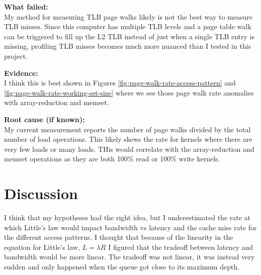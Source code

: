 \documentclass[11pt]{article}
\begin{document}
\begin{failurebox}
	\textbf{What failed:} \\
	My method for measuring TLB page walks likely is not the best way to measure TLB misses. Since this computer has
	multiple TLB levels and a page table walk can be triggered to fill up the L2 TLB instead of just when a single TLB
	entry is missing, profiling TLB misses becomes much more nuanced than I tested in this project.

	\textbf{Evidence:} \\

	I think this is best shown in Figures \ref{fig:page-walk-rate-access-pattern} and
	\ref{fig:page-walk-rate-working-set-size} where we see those page walk rate anomalies with array-reduction and memset.

	\textbf{Root cause (if known):} \\

	My current measurement reports the number of page walks divided by the total number of load operations. This likely
	skews the rate for kernels where there are very few loads or many loads. THis would correlate with the array-reduction
	and memset operations as they are both 100\% read or 100\% write kernels.

\end{failurebox}

\section{Discussion}


I think that my hypotheses had the right idea, but I underestimated the rate at which Little's law would impact
bandwidth vs latency and the cache miss rate for the different access patterns. I thought that because of the linearity
in the equation for Little's law, $L = \lambda R$ I figured that the tradeoff between latency and bandwidth would be
more linear. The tradeoff was not linear, it was instead very sudden and only happened when the queue got close to its
maximum depth.
\end{document}
